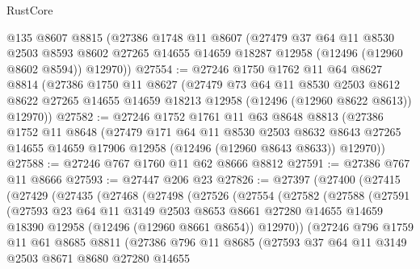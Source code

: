 \begin{lexlean}{RustCore}
\begin{coremodule}
    @135
    @8607
    @8815
    (@27386
      @1748
      @11
      @8607
      (@27479
        @37
        @64
        @11
        @8530
        @2503
        @8593
        @8602
        @27265
        @14655
        @14659
        @18287
        @12958
        (@12496 (@12960 @8602 @8594))
        @12970))
@27554 := @27246
    @1750
    @1762
    @11
    @64
    @8627
    @8814
    (@27386
      @1750
      @11
      @8627
      (@27479
        @73
        @64
        @11
        @8530
        @2503
        @8612
        @8622
        @27265
        @14655
        @14659
        @18213
        @12958
        (@12496 (@12960 @8622 @8613))
        @12970))
@27582 := @27246
    @1752
    @1761
    @11
    @63
    @8648
    @8813
    (@27386
      @1752
      @11
      @8648
      (@27479
        @171
        @64
        @11
        @8530
        @2503
        @8632
        @8643
        @27265
        @14655
        @14659
        @17906
        @12958
        (@12496 (@12960 @8643 @8633))
        @12970))
@27588 := @27246 @767 @1760 @11 @62 @8666 @8812
@27591 := @27386 @767 @11 @8666
@27593 := @27447 @206 @23
@27826 := @27397
    (@27400
      (@27415
        (@27429
          (@27435
            (@27468
              (@27498
                (@27526
                  (@27554
                    (@27582
                      (@27588
                        (@27591
                          (@27593
                            @23
                            @64
                            @11
                            @3149
                            @2503
                            @8653
                            @8661
                            @27280
                            @14655
                            @14659
                            @18390
                            @12958
                            (@12496 (@12960 @8661 @8654))
                            @12970))
                        (@27246
                          @796
                          @1759
                          @11
                          @61
                          @8685
                          @8811
                          (@27386
                            @796
                            @11
                            @8685
                            (@27593
                              @37
                              @64
                              @11
                              @3149
                              @2503
                              @8671
                              @8680
                              @27280
                              @14655

\end{coremodule}
\end{lexlean}
